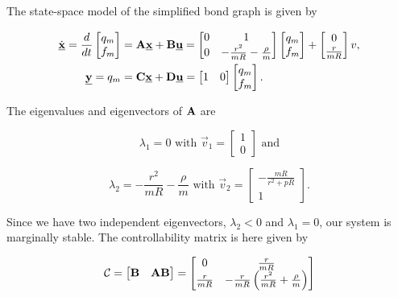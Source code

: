 \documentclass[11pt,titlepage]{report}
\begin{document}
The state-space model of the simplified bond graph is given by

\begin{align} \label{eq:ass-1-model-final}
	\dot{\mathbf{\underline{x}}} = \frac{d}{dt}
	\begin{bmatrix}
		q_m \\
		f_m
	\end{bmatrix} &= \mathbf{A} \mathbf{\underline{x}} + \mathbf{B} \mathbf{\underline{u}} =
	\begin{bmatrix}
		0 & 1 \\
		0 & -\frac{r^2}{m R}-\frac{\rho}{m}
	\end{bmatrix}
	\begin{bmatrix}
		q_m \\
		f_m
	\end{bmatrix} +
	\begin{bmatrix}
		0 \\
		\frac{r}{m R}
	\end{bmatrix} v, \\
	\mathbf{\underline{y}} = q_m &= \mathbf{C} \mathbf{\underline{x}} + \mathbf{D} \mathbf{\underline{u}} =
	\begin{bmatrix}
		1 & 0
	\end{bmatrix}
	\begin{bmatrix}
		q_m \\
		f_m
	\end{bmatrix}.
\end{align}

The eigenvalues and eigenvectors of $\mathbf{A}$ are

\begin{equation}
	\lambda_1 = 0\text{ with }
	\vec{v}_1 = \begin{bmatrix}
		1 \\
		0
	\end{bmatrix}\text{ and}
\end{equation}

\begin{equation}
	\lambda_2 = -\frac{r^2}{m R}-\frac{\rho}{m}\text{ with }
	\vec{v}_2 = \begin{bmatrix}
		-\frac{m R}{r^2 + p R} \\
		1
	\end{bmatrix}.
\end{equation}

Since we have two independent eigenvectors, $\lambda_2 < 0$ and $\lambda_1 = 0$, our system is marginally stable. The controllability matrix is here given by

\begin{equation}
	\mathcal{C} = \begin{bmatrix}
		\mathbf{B} & \mathbf{A} \mathbf{B}
	\end{bmatrix} = \begin{bmatrix}
		0 & \frac{r}{m R} \\
		\frac{r}{m R} & -\frac{r}{m R} \left(\frac{r^2}{m R}+\frac{\rho}{m} \right)
	\end{bmatrix}
\end{equation}
\end{document}
